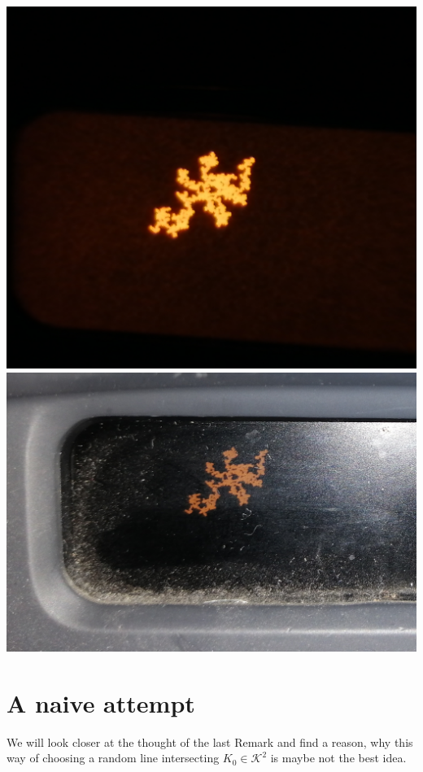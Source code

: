 \documentclass[12pt,a4paper]{scrartcl}
\numberwithin{equation}{subsection}
\newcommand{\K}{\mathcal{K}}
\numberwithin{equation}{section}
\theoremstyle{definition}
\begin{document}
\includegraphics[scale=0.04]{display.jpg} 
\includegraphics[scale=0.091]{display2.jpg} 

\newpage
\section{A naive attempt}

We will look closer at the thought of the last Remark and find a reason, why this way of choosing a random line intersecting $K_0\in\K^2$ is maybe not the best idea. 
\end{document}
